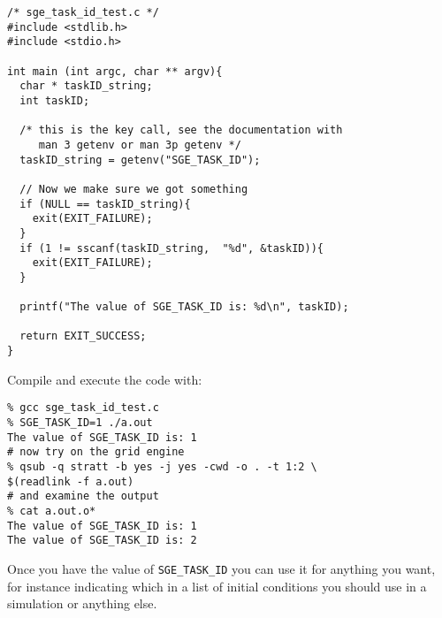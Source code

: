 \documentclass[letterpaper,12pt]{article}
\begin{document}
\begin{verbatim}
/* sge_task_id_test.c */
#include <stdlib.h>
#include <stdio.h>

int main (int argc, char ** argv){
  char * taskID_string;
  int taskID;

  /* this is the key call, see the documentation with 
     man 3 getenv or man 3p getenv */
  taskID_string = getenv("SGE_TASK_ID");

  // Now we make sure we got something
  if (NULL == taskID_string){
    exit(EXIT_FAILURE);
  }
  if (1 != sscanf(taskID_string,  "%d", &taskID)){
    exit(EXIT_FAILURE);
  }

  printf("The value of SGE_TASK_ID is: %d\n", taskID);

  return EXIT_SUCCESS;
}
\end{verbatim}
Compile and execute the code with:

\begin{verbatim}
% gcc sge_task_id_test.c
% SGE_TASK_ID=1 ./a.out
The value of SGE_TASK_ID is: 1
# now try on the grid engine
% qsub -q stratt -b yes -j yes -cwd -o . -t 1:2 \
$(readlink -f a.out)
# and examine the output
% cat a.out.o*
The value of SGE_TASK_ID is: 1
The value of SGE_TASK_ID is: 2
\end{verbatim}

Once you have the value of \texttt{SGE\_TASK\_ID} you can use it for anything you want, for instance indicating which in a list of initial conditions you should use in a simulation or anything else.
\end{document}
